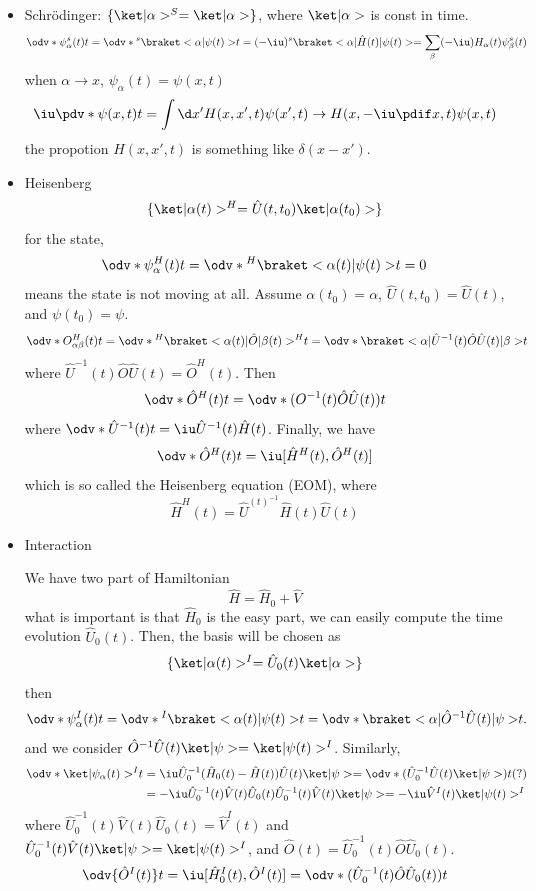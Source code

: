 \begin{itemize}
  \item Schr\"odinger: $\{\ket|\alpha>^S = \ket|\alpha>\}$, where $\ket|\alpha>$ is const in time.
  \[
    \odv*{\psi_\alpha^s(t)}t = \odv*{^s\braket<\alpha|\psi(t)>}t
  = (-\iu) ^s\braket<\alpha|\hat H(t)|\psi(t)> = \sum_\beta (-\iu) H_{\alpha} (t) \psi_\beta^s (t)
  \]
  when $\alpha \to x$, $\psi_\alpha(t) = \psi(x,t)$
  \[
    \iu \pdv*{\psi(x,t)}t = \int \d x' H(x,x',t) \psi(x',t)
    \to H(x,-\iu\pdif x, t) \psi(x,t)
  \]
  the propotion $H(x,x',t) $ is something like $\delta(x - x')$.
  \item Heisenberg
  \[
    \{\ket|\alpha(t)>^H = \hat U(t,t_0) \ket|\alpha(t_0)>\}
  \]
  for the state,
  \begin{equation}
    \odv*{\psi_\alpha^H(t)}t = \odv*{^H\braket<\alpha(t)|\psi(t)>}t = 0
  \end{equation}
  means the state is not moving at all.
  Assume $\alpha(t_0) = \alpha$, $\hat U(t,t_0) = \hat U(t)$, and $\psi(t_0) = \psi$.
  \[
    \odv*{O_{\alpha\beta}^H(t)}t = \odv*{^H\braket<\alpha(t)|\hat O|\beta(t)>^H}t = \odv*{\braket<\alpha|\hat U^{-1}(t) \hat O \hat U(t)|\beta>}t
  \]
  where $\hat U^{-1}(t) \hat O \hat U(t) = \hat O^H(t)$. Then
  \[
    \odv*{\hat O^H(t)}t = \odv*{(O^{-1}(t) \hat O \hat U(t))}t
  \]
  where $\odv*{\hat U^{-1}(t)}t = \iu \hat U^{-1}(t) \hat H(t)$.
  Finally, we have
  \begin{equation}
    \odv*{\hat O^H(t)}t = \iu[\hat H^H(t), \hat O^H(t)]
  \end{equation}
  which is so called the Heisenberg equation (EOM), where
  \[
    \hat H^H(t) = \hat U^(t)^{-1} \hat H(t) \hat U(t)
  \]
  \item Interaction
  
  We have two part of Hamiltonian
  \[
    \hat H = \hat H_0 + \hat V
  \]
  what is important is that $\hat H_0$ is the easy part,
  we can easily compute the time evolution $\hat U_0(t)$.
  Then, the basis will be chosen as
  \[
    \{\ket|\alpha(t)>^I = \hat U_0(t) \ket|\alpha>\}
  \]
  then
  \begin{equation}
    \odv*{\psi_\alpha^I(t)}t = \odv*{^I\braket<\alpha(t)|\psi(t)>}t
  = \odv*{\braket<\alpha|\hat O^{-1} \hat U(t)|\psi>}t.
  \end{equation}
  and we consider $\hat O^{-1} \hat U(t)\ket|\psi> = \ket|\psi(t)>^I$.
  Similarly,
  \begin{align*}
    \odv*{\ket|\psi_\alpha(t)>^I}t &
  = \iu \hat U_0^{-1} (\hat H_0(t) - \hat H(t)) \hat U(t) \ket|\psi>
  = \odv*{(\hat U_0^{-1} \hat U(t) \ket|\psi>)}t (?)\\ &
  = -\iu \hat U_0^{-1}(t) \hat V(t) \hat U_0(t) \hat U_0^{-1}(t) \hat V(t) \ket|\psi>
  = -\iu \hat V^I(t) \ket|\psi(t)>^I
  \end{align*}
  where $\hat U_0^{-1}(t) \hat V(t) \hat U_0(t) = \hat V^I(t)$ and
  $\hat U_0^{-1}(t) \hat V(t) \ket|\psi> = \ket|\psi(t)>^I$,
  and $\hat O(t) = \hat U_0^{-1}(t) \hat O \hat U_0(t)$.
  \[
    \odv{\hat O^I(t)}t = \iu [\hat H_0^I(t), \hat O^I(t)]
  = \odv*{(\hat U_0^{-1}(t) \hat O \hat U_0(t))}t
  \]
\end{itemize}

